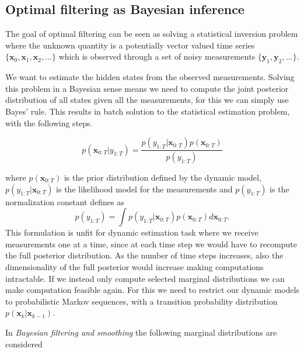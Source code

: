 \subsection{Optimal filtering as Bayesian inference}
The goal of optimal filtering can be seen as solving a statistical
inversion problem where
the unknown quantity is a potentially vector valued
time series $\{\mathbf{x}_0, \mathbf{x}_1, \mathbf{x}_2,...\}$ which
is observed through a set of noisy measurements
$\{\mathbf{y}_1, \mathbf{y}_2,...\}$.


We want to estimate the hidden states from the observed
measurements. Solving this problem in a Bayesian
sense means we 
need to compute the joint posterior distribution of all
states given all the measurements, for this we can simply
use Bayes' rule.
This results in batch solution to the statistical estimation problem,
with the following steps.

$$
p(\mathbf{x}_{0:T} | y_{1:T})
= \frac{p(y_{1:T} | \mathbf{x}_{0:T}) p(\mathbf{x}_{0:T})}
{p(y_{1:T})}
$$

where $p(\mathbf{x}_{0:T})$ is the prior distribution defined by the dynamic
model, $p(y_{1:T} | \mathbf{x}_{0:T})$ is the likelihood model for the
measurements and $p(y_{1:T})$ is the normalization constant defines as
$$ p(y_{1:T}) = \int p(y_{1:T} | \mathbf{x}_{0:T})
p(\mathbf{x}_{0:T}) d \mathbf{x}_{0:T}.$$
This formulation is unfit for dynamic estimation task where
we receive measurements one at a time, since
at each time step we would have to
recompute the full posterior distribution. As the number of
time steps increases, also the dimensionality of the full posterior
would increase making computations intractable.
If we instead only compute selected marginal distributions we can
make computation feasible again. For this we need to restrict
our dynamic models to probabilistic Markov sequences, with a
transition probability distribution $p(\mathbf{x}_k | \mathbf{x}_{k-1})$.

In \textit{Bayesian filtering and smoothing} the following marginal
distributions are considered

